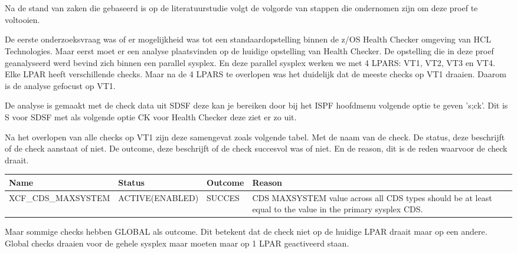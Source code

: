 
\chapter{}
\label{ch:methodologie}




Na de stand van zaken die gebaseerd is op de literatuurstudie volgt de volgorde van stappen die ondernomen zijn om deze proef te voltooien. 

De eerste onderzoeksvraag was of er mogelijkheid was tot een standaardopstelling binnen de z/OS Health Checker omgeving van HCL Technologies. Maar eerst moet er een analyse plaatsvinden op de huidige opstelling van Health Checker. De opstelling die in deze proef geanalyseerd werd bevind zich binnen een parallel sysplex. En deze parallel sysplex werken we met 4 LPARS: VT1, VT2, VT3 en VT4. Elke LPAR heeft verschillende checks. Maar na de 4 LPARS te overlopen was het duidelijk dat de meeste checks op VT1 draaien. Daarom is de analyse gefocust op VT1.

De analyse is gemaakt met de check data uit SDSF deze kan je bereiken door bij het ISPF hoofdmenu volgende optie te geven 's;ck'. Dit is S voor SDSF met als volgende optie CK voor Health Checker deze ziet er zo uit.



Na het overlopen van alle checks op VT1 zijn deze samengevat zoals volgende tabel. Met de naam van de check. De status, deze beschrijft of de check aanstaat of niet. De outcome, deze beschrijft of de check succesvol was of niet. En de reason, dit is de reden waarvoor de check draait.

\begin{tabular}{|p{5cm}|p{3.5cm}|p{1.5cm}|p{5cm}|}
	\hline
	\textbf{Name} & \textbf{Status} & \textbf{Outcome} & \textbf{Reason} \\
	\hline
	XCF\_CDS\_MAXSYSTEM & ACTIVE(ENABLED) & SUCCES & CDS MAXSYSTEM value across all CDS types should be at least equal to the value 
	in the primary sysplex CDS.  \\
	\hline
\end{tabular}

Maar sommige checks hebben GLOBAL als outcome. Dit betekent dat de check niet op de huidige LPAR draait maar op een andere. Global checks draaien voor de gehele sysplex maar moeten maar op 1 LPAR geactiveerd staan.

